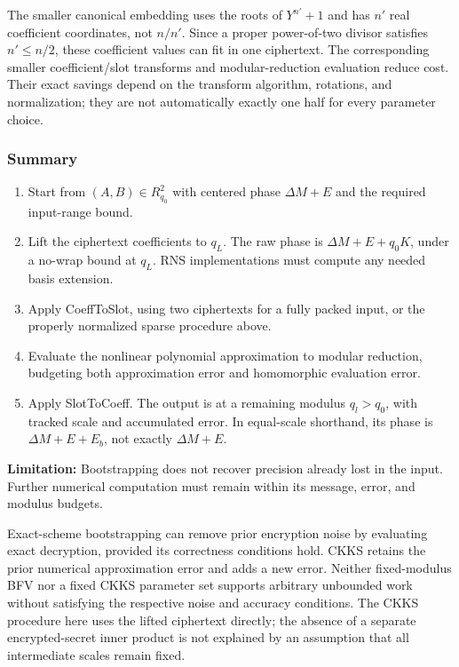 The smaller canonical embedding uses the roots of $Y^{n'}+1$ and has $n'$ real coefficient coordinates, not $n/n'$. Since a proper power-of-two divisor satisfies $n'\leq n/2$, these coefficient values can fit in one ciphertext. The corresponding smaller coefficient/slot transforms and modular-reduction evaluation reduce cost. Their exact savings depend on the transform algorithm, rotations, and normalization; they are not automatically exactly one half for every parameter choice.

\subsubsection{Summary}
\label{subsubsec:ckks-bootstrapping-summary}

\begin{tcolorbox}[title={\textbf{\tboxlabel{\ref*{subsubsec:ckks-bootstrapping-summary}} CKKS Bootstrapping}}]
\begin{enumerate}
\item Start from $(A,B)\in R_{q_0}^2$ with centered phase $\Delta M+E$ and the required input-range bound.
\item Lift the ciphertext coefficients to $q_L$. The raw phase is $\Delta M+E+q_0K$, under a no-wrap bound at $q_L$. RNS implementations must compute any needed basis extension.
\item Apply CoeffToSlot, using two ciphertexts for a fully packed input, or the properly normalized sparse procedure above.
\item Evaluate the nonlinear polynomial approximation to modular reduction, budgeting both approximation error and homomorphic evaluation error.
\item Apply SlotToCoeff. The output is at a remaining modulus $q_l>q_0$, with tracked scale and accumulated error. In equal-scale shorthand, its phase is $\Delta M+E+E_b$, not exactly $\Delta M+E$.
\end{enumerate}
\textbf{Limitation:} Bootstrapping does not recover precision already lost in the input. Further numerical computation must remain within its message, error, and modulus budgets.
\end{tcolorbox}

 Exact-scheme bootstrapping can remove prior encryption noise by evaluating exact decryption, provided its correctness conditions hold. CKKS retains the prior numerical approximation error and adds a new error. Neither fixed-modulus BFV nor a fixed CKKS parameter set supports arbitrary unbounded work without satisfying the respective noise and accuracy conditions. The CKKS procedure here uses the lifted ciphertext directly; the absence of a separate encrypted-secret inner product is not explained by an assumption that all intermediate scales remain fixed.


